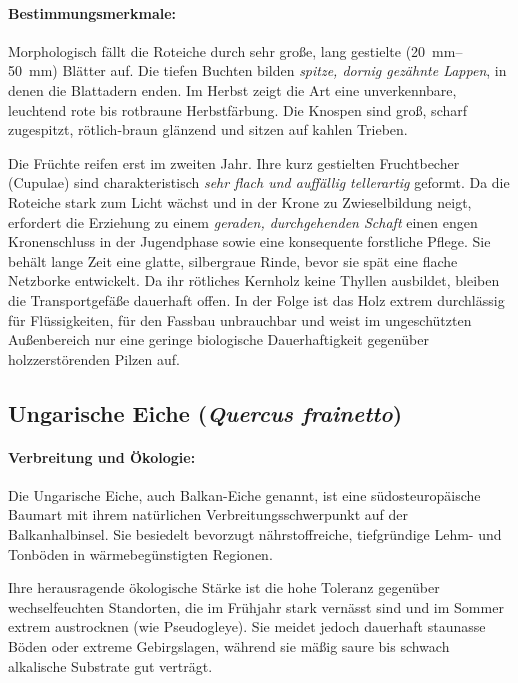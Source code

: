 \documentclass[twocolumn, bibliography=totoc, abstract=true]{scrartcl}
\begin{document}
\paragraph{Bestimmungsmerkmale:}

Morphologisch fällt die Roteiche durch sehr große, lang gestielte (\qtyrange{20}{50}{\mm}) Blätter auf. Die tiefen Buchten bilden \emph{spitze, dornig gezähnte Lappen}, in denen die Blattadern enden. Im Herbst zeigt die Art eine unverkennbare, leuchtend rote bis rotbraune Herbstfärbung. Die Knospen sind groß, scharf zugespitzt, rötlich-braun glänzend und sitzen auf kahlen Trieben. 

Die Früchte reifen erst im zweiten Jahr. Ihre kurz gestielten Fruchtbecher (Cupulae) sind charakteristisch \emph{sehr flach und auffällig tellerartig} geformt. Da die Roteiche stark zum Licht wächst und in der Krone zu Zwieselbildung neigt, erfordert die Erziehung zu einem \emph{geraden, durchgehenden Schaft} einen engen Kronenschluss in der Jugendphase sowie eine konsequente forstliche Pflege. Sie behält lange Zeit eine glatte, silbergraue Rinde, bevor sie spät eine flache Netzborke entwickelt. Da ihr rötliches Kernholz keine Thyllen ausbildet, bleiben die Transportgefäße dauerhaft offen. In der Folge ist das Holz extrem durchlässig für Flüssigkeiten, für den Fassbau unbrauchbar und weist im ungeschützten Außenbereich nur eine geringe biologische Dauerhaftigkeit gegenüber holzzerstörenden Pilzen auf.

\subsection{Ungarische Eiche (\textit{Quercus frainetto})}

\paragraph{Verbreitung und Ökologie:}
Die Ungarische Eiche, auch Balkan-Eiche genannt, ist eine südosteuropäische Baumart mit ihrem natürlichen Verbreitungsschwerpunkt auf der Balkanhalbinsel. Sie besiedelt bevorzugt nährstoffreiche, tiefgründige Lehm- und Tonböden in wärmebegünstigten Regionen. 

Ihre herausragende ökologische Stärke ist die hohe Toleranz gegenüber wechselfeuchten Standorten, die im Frühjahr stark vernässt sind und im Sommer extrem austrocknen (wie Pseudogleye). Sie meidet jedoch dauerhaft staunasse Böden oder extreme Gebirgslagen, während sie mäßig saure bis schwach alkalische Substrate gut verträgt.
\end{document}
